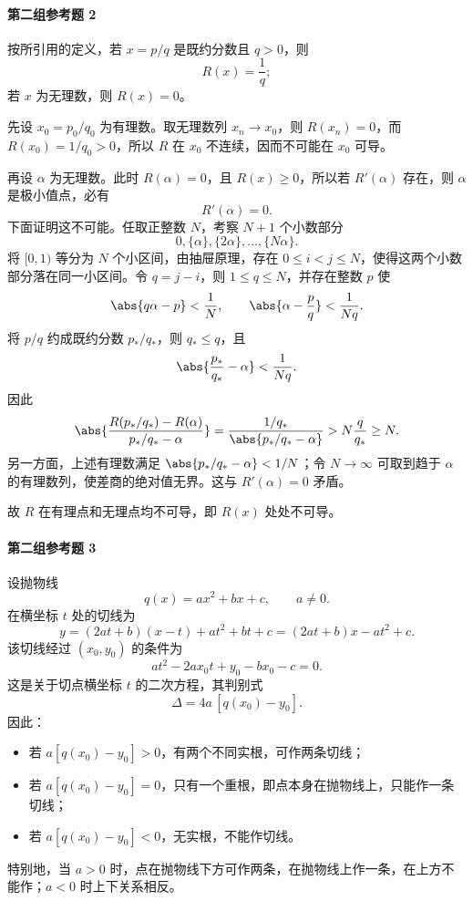 \paragraph{第二组参考题 2}
\begin{xsolution}
按所引用的定义，若 $x=p/q$ 是既约分数且 $q>0$，则
\[
  R(x)=\frac1q;
\]
若 $x$ 为无理数，则 $R(x)=0$。

先设 $x_0=p_0/q_0$ 为有理数。取无理数列 $x_n\to x_0$，则 $R(x_n)=0$，而 $R(x_0)=1/q_0>0$，所以 $R$ 在 $x_0$ 不连续，因而不可能在 $x_0$ 可导。

再设 $\alpha$ 为无理数。此时 $R(\alpha)=0$，且 $R(x)\ge0$，所以若 $R'(\alpha)$ 存在，则 $\alpha$ 是极小值点，必有
\[
  R'(\alpha)=0.
\]
下面证明这不可能。任取正整数 $N$，考察 $N+1$ 个小数部分
\[
  0,\{\alpha\},\{2\alpha\},\ldots,\{N\alpha\}.
\]
将 $[0,1)$ 等分为 $N$ 个小区间，由抽屉原理，存在 $0\le i<j\le N$，使得这两个小数部分落在同一小区间。令 $q=j-i$，则 $1\le q\le N$，并存在整数 $p$ 使
\[
  \abs{q\alpha-p}<\frac1N,
  \qquad
  \abs{\alpha-\frac pq}<\frac1{Nq}.
\]
将 $p/q$ 约成既约分数 $p_*/q_*$，则 $q_*\le q$，且
\[
  \abs{\frac{p_*}{q_*}-\alpha}<\frac1{Nq}.
\]
因此
\[
  \abs{\frac{R(p_*/q_*)-R(\alpha)}{p_*/q_*-\alpha}}
  =\frac{1/q_*}{\abs{p_*/q_*-\alpha}}
  >N\frac q{q_*}\ge N.
\]
另一方面，上述有理数满足 $\abs{p_*/q_*-\alpha}<1/N$；令 $N\to\infty$ 可取到趋于 $\alpha$ 的有理数列，使差商的绝对值无界。这与 $R'(\alpha)=0$ 矛盾。

故 $R$ 在有理点和无理点均不可导，即 $R(x)$ 处处不可导。
\end{xsolution}

\paragraph{第二组参考题 3}
\begin{xsolution}
设抛物线
\[
  q(x)=ax^2+bx+c,\qquad a\ne0.
\]
在横坐标 $t$ 处的切线为
\[
  y=(2at+b)(x-t)+at^2+bt+c
  =(2at+b)x-at^2+c.
\]
该切线经过 $(x_0,y_0)$ 的条件为
\[
  at^2-2ax_0t+y_0-bx_0-c=0.
\]
这是关于切点横坐标 $t$ 的二次方程，其判别式
\[
  \Delta=4a\,[q(x_0)-y_0].
\]
因此：
\begin{itemize}
  \item 若 $a[q(x_0)-y_0]>0$，有两个不同实根，可作两条切线；
  \item 若 $a[q(x_0)-y_0]=0$，只有一个重根，即点本身在抛物线上，只能作一条切线；
  \item 若 $a[q(x_0)-y_0]<0$，无实根，不能作切线。
\end{itemize}
特别地，当 $a>0$ 时，点在抛物线下方可作两条，在抛物线上作一条，在上方不能作；$a<0$ 时上下关系相反。
\end{xsolution}

